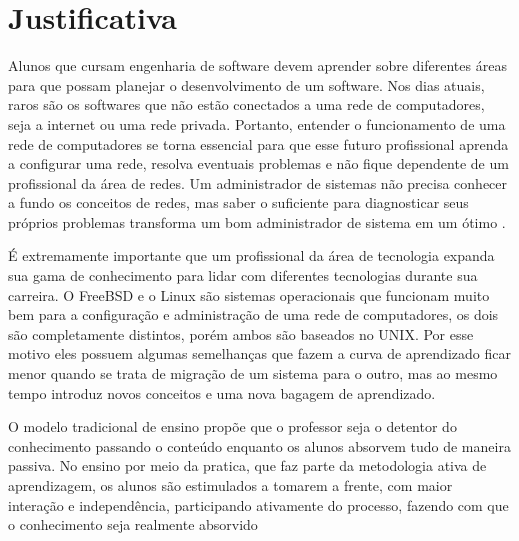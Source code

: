 %


\section{Justificativa}

Alunos que cursam engenharia de software devem aprender sobre diferentes áreas para que possam planejar o desenvolvimento de um software. Nos dias atuais, raros são os softwares que não estão conectados a uma rede de computadores, seja a internet ou uma rede privada. Portanto, entender o funcionamento de uma rede de computadores se torna essencial para que esse futuro profissional aprenda a configurar uma rede, resolva eventuais problemas e não fique dependente de um profissional da área de redes. Um administrador de sistemas não precisa conhecer a fundo os conceitos de redes, mas saber o suficiente para diagnosticar seus próprios problemas transforma um bom administrador de sistema em um ótimo \cite{Lucas2019}.

É extremamente importante que um profissional da área de tecnologia expanda sua gama de conhecimento para lidar com diferentes tecnologias durante sua carreira. O FreeBSD e o Linux são sistemas operacionais que funcionam muito bem para a configuração e administração de uma rede de computadores, os dois são completamente distintos, porém ambos são baseados no UNIX. Por esse motivo eles possuem algumas semelhanças que fazem a curva de aprendizado ficar menor quando se trata de migração de um sistema para o outro, mas ao mesmo tempo introduz novos conceitos e uma nova bagagem de aprendizado.

O modelo tradicional de ensino propõe que o professor seja o detentor do conhecimento passando o conteúdo enquanto os alunos absorvem tudo de maneira passiva. No ensino por meio da pratica, que faz parte da metodologia ativa de aprendizagem, os alunos são estimulados a tomarem a frente, com maior interação e independência, participando ativamente do processo, fazendo com que o conhecimento seja realmente absorvido \cite{MetodologiaAtiva} %

